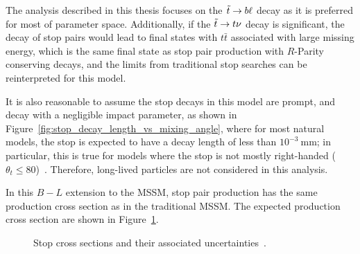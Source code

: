 The analysis described in this thesis focuses on the $\tilde{t} \rightarrow b\ell$ decay
as it is preferred for most of parameter space.
Additionally, if the $\tilde{t} \rightarrow t\nu$ decay is significant, the decay of stop
pairs would lead to final states with $t\bar{t}$ associated with large missing
energy, which is the same final state as stop pair production with
$R$-Parity conserving decays, and the limits from traditional stop searches can
be reinterpreted for this model.

It is also reasonable to assume the stop decays in this model are prompt, and
decay with a negligible impact parameter, as shown in
Figure~\ref{fig:stop_decay_length_vs_mixing_angle}, where for most natural
models, the stop is expected to have a decay length of less than
$10^{-3}~\mathrm{mm}$;
in particular, this is true for models where the stop is not mostly
right-handed ($\theta_t \leq 80$)~\cite{Marshall:2014cwa,Marshall:2014kea}.
Therefore, long-lived particles are not considered in this analysis.

In this $B-L$ extension to the MSSM, stop pair production has the same
production cross section as in the traditional MSSM.
The expected production cross section are shown in Figure~\ref{fig:stop_xsec}.

\begin{figure}[ht]
  \caption{Stop cross sections and their associated
    uncertainties~\cite{Beenakker:1997ut,Beenakker:2010nq,Beenakker:2011fu}.
  }
  \label{fig:stop_xsec}
\end{figure}

